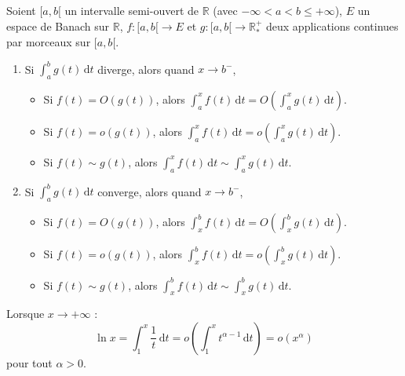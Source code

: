 
  \begin{theorem}
    Soient $[a,b[$ un intervalle semi-ouvert de $\mathbb{R}$ (avec $-\infty < a < b \leq +\infty$), $E$ un espace de Banach sur $\mathbb{R}$, $f : [a,b[ \rightarrow E$ et $g : [a,b[ \rightarrow \mathbb{R}^+_*$ deux applications continues par morceaux sur $[a,b[$.
    \begin{enumerate}[label={\bfseries(\roman*)}]
      \item Si $\int_a^b g(t) \, \mathrm{d}t$ diverge, alors quand $x \rightarrow b^-$,
      \begin{itemize}
        \item Si $f(t) = O(g(t))$, alors $\int_a^x f(t) \, \mathrm{d}t = O\left( \int_a^x g(t) \, \mathrm{d}t \right)$.
        \item Si $f(t) = o(g(t))$, alors $\int_a^x f(t) \, \mathrm{d}t = o\left( \int_a^x g(t) \, \mathrm{d}t \right)$.
        \item Si $f(t) \sim g(t)$, alors $\int_a^x f(t) \, \mathrm{d}t \sim \int_a^x g(t) \, \mathrm{d}t$.
      \end{itemize}
      \item Si $\int_a^b g(t) \, \mathrm{d}t$ converge, alors quand $x \rightarrow b^-$,
      \begin{itemize}
        \item Si $f(t) = O(g(t))$, alors $\int_x^b f(t) \, \mathrm{d}t = O\left( \int_x^b g(t) \, \mathrm{d}t \right)$.
        \item Si $f(t) = o(g(t))$, alors $\int_x^b f(t) \, \mathrm{d}t = o\left( \int_x^b g(t) \, \mathrm{d}t \right)$.
        \item Si $f(t) \sim g(t)$, alors $\int_x^b f(t) \, \mathrm{d}t \sim \int_x^b g(t) \, \mathrm{d}t$.
      \end{itemize}
    \end{enumerate}
  \end{theorem}

  \begin{example}
    Lorsque $x \rightarrow +\infty$ :
    \[ \ln x = \int_1^x \frac{1}{t} \, \mathrm{d}t = o \left( \int_1^x t^{\alpha-1} \, \mathrm{d}t \right) = o(x^\alpha) \]
    pour tout $\alpha > 0$.
  \end{example}

